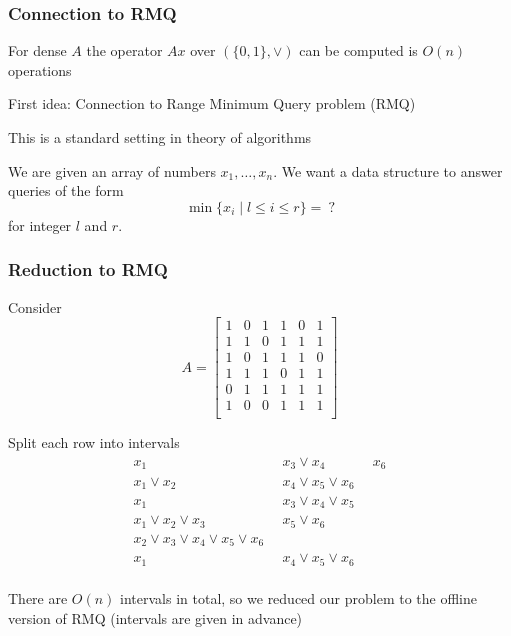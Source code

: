 \documentclass{beamer}
\begin{document}
\begin{frame}
\frametitle{Connection to RMQ}

\begin{theorem}
For dense $A$ the operator $Ax$ over $(\{0,1\},\vee)$ can be computed is $O(n)$ operations
\end{theorem}


\medskip
First idea: Connection to Range Minimum Query problem (RMQ)

\medskip
This is a standard setting in theory of algorithms

\medskip
We are given an array of numbers $x_1,\ldots, x_n$. We want a data structure to answer queries of the form 
$$
\min\{x_i \mid l\leq i \leq r\}=\ ?
$$ 
for integer $l$ and $r$.

\end{frame}


\begin{frame}
\frametitle{Reduction to RMQ}

Consider
\[
 A =\begin{bmatrix}
    1 & 0 & 1 & 1 & 0 & 1 \\
    1 & 1 & 0 & 1 & 1 & 1 \\
    1 & 0 & 1 & 1 & 1 & 0 \\
    1 & 1 & 1 & 0 & 1 & 1 \\
    0 & 1 & 1 & 1 & 1 & 1 \\
    1 & 0 & 0 & 1 & 1 & 1 \\
    \end{bmatrix}
\]

Split each row into intervals
\[
\begin{array}{lll}
    x_1 & \phantom{0}x_3 \vee x_4 & \phantom{0}x_6 \\
    x_1 \vee x_2& \phantom{0}x_4\vee x_5 \vee x_6 & \\
    x_1& \phantom{0}x_3\vee x_4 \vee x_5 &\\
    x_1\vee x_2 \vee x_3& \phantom{0}x_5 \vee x_6 &\\
    x_2\vee x_3 \vee x_4\vee x_5 \vee x_6 &&\\
    x_1& \phantom{0}x_4 \vee x_5\vee x_6 &\\
    \end{array}
\]

There are $O(n)$ intervals in total, so we reduced our problem to the offline version of RMQ (intervals are given in advance)


\end{frame}
\end{document}
